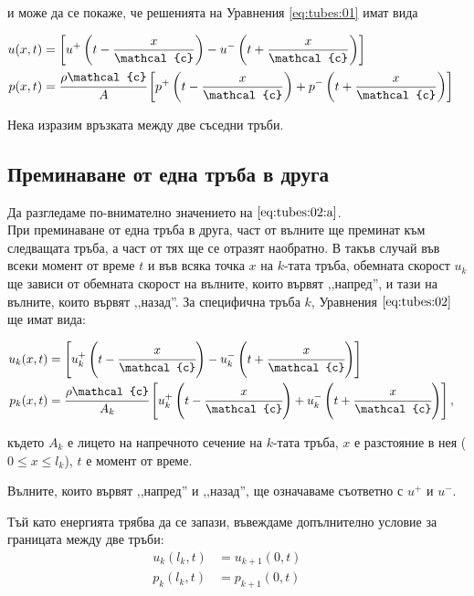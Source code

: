 \documentclass[main.tex]{subfiles}
\begin{document}
и може да се покаже, че решенията на Уравнения \ref{eq:tubes:01} имат вида

\begin{subequations}
    \label{eq:tubes:02}
    \begin{flalign}
        \label{eq:tubes:02:a} u(x, t) & = \Q{u^+\B{t - \frac{x}{\mathcal{c}}} - u^-\B{t + \frac{x}{\mathcal{c}}}} && \\
        p(x, t) & = \cfrac{\rho \mathcal{c}}{A}\Q{p^+\B{t - \frac{x}{\mathcal{c}}} + p^-\B{t + \frac{x}{\mathcal{c}}}} &&
    \end{flalign}
\end{subequations}

Нека изразим връзката между две съседни тръби.

\subsection{Преминаване от една тръба в друга}

Да разгледаме по-внимателно значението на $\eqref{eq:tubes:02:a}$.\\
При преминаване от една тръба в друга, част от вълните ще преминат към следващата тръба, а част от тях ще се отразят наобратно.
В такъв случай във всеки момент от време $t$ и във всяка точка $x$ на $k$-тата тръба, обемната скорост $u_k$ ще зависи от обемната скорост на вълните, които вървят ,,напред'', и тази на вълните, които вървят ,,назад''. За специфична тръба $k$, Уравнения $\eqref{eq:tubes:02}$ ще имат вида:

\begin{subequations}
    \label{eq:tubes:03}
    \begin{flalign}
        \label{eq:tubes:03:a} u_{k}(x, t) &= \Q{u_{k}^{+}\B{t - \cfrac{x}{\mathcal{c}}} - u_{k}^{-}\B{t + \cfrac{x}{\mathcal{c}}}} && \\
        p_{k}(x, t) &= \cfrac{\rho \mathcal{c}}{A_{k}} \Q{u_{k}^{+}\B{t - \cfrac{x}{\mathcal{c}}} + u_{k}^{-}\B{t + \cfrac{x}{\mathcal{c}}}},&&
    \end{flalign}
\end{subequations}

където $A_k$ е лицето на напречното сечение на $k$-тата тръба, $x$ е разстояние в нея ($0\leq x \leq l_k$), $t$ е момент от време.

Вълните, които вървят ,,напред'' и ,,назад'', ще означаваме съответно с $u^{+}$ и $u^{-}$.

Тъй като енергията трябва да се запази, въвеждаме допълнително условие за границата между две тръби:
\begin{subequations}
    \label{eq:tubes:04}
    \begin{flalign}
        u_k(l_k, t) & = u_{k+1}(0, t) &&\\
        p_k(l_k, t) & = p_{k+1}(0, t) &&
    \end{flalign}
\end{subequations}
\end{document}
